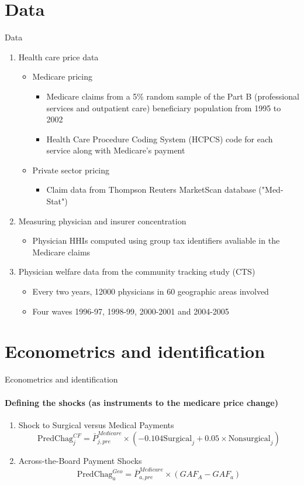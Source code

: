 \documentclass{beamer}
\begin{document}
\section{Data}
\begin{frame}{Data}
\begin{enumerate}
\item Health care price data \\
	\begin{itemize}
	\item Medicare pricing
		\begin{itemize}
		\item Medicare claims from a 5\% random sample of the Part B (professional services and outpatient care) beneficiary population from 1995 to 2002
		\item Health Care Procedure Coding System (HCPCS) code for each service along with Medicare's payment
		\end{itemize}
	\item Private sector pricing
		\begin{itemize}
		\item Claim data from Thompson Reuters MarketScan database ("Med-Stat")
		\end{itemize}
	\end{itemize}
\item Measuring physician and insurer concentration
	\begin{itemize}
	\item Physician HHIs computed using group tax identifiers avaliable in the Medicare claims
	\end{itemize}
\item Physician welfare data from the community tracking study (CTS)
	\begin{itemize}
	\item Every two years, 12000 physicians in 60 geographic areas involved
	\item Four waves 1996-97, 1998-99, 2000-2001 and 2004-2005
	\end{itemize}
\end{enumerate}
\end{frame}

\section{Econometrics and identification}
\begin{frame}{Econometrics and identification}
\framesubtitle{Defining the shocks (as instruments to the medicare price change)}
\begin{enumerate}
\item Shock to Surgical versus Medical Payments
$$\text{PredChag}_j^{CF} =  \bar{P}_{j,pre}^{Medicare} \times (-0.104\text{Surgical}_j + 0.05\times \text{Nonsurgical}_j)$$
\hfill \break
\item Across-the-Board Payment Shocks
$$\text{PredChag}_a^{Geo} =   \bar{P}_{a,pre}^{Medicare} \times (GAF_A - GAF_a)$$
\end{enumerate}
\end{frame}
\end{document}
